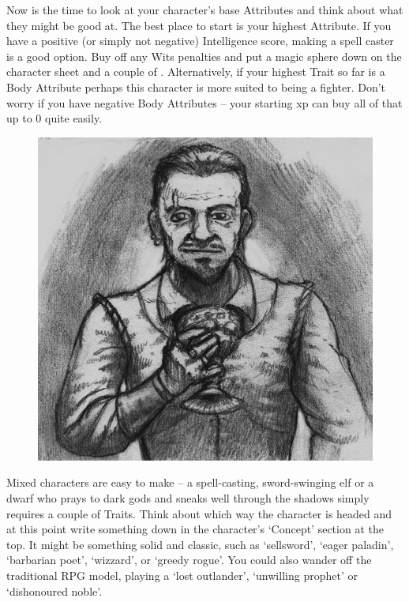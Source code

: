 \begin{multicols}{2}
{Now is the time to look at your character's base Attributes and think about what they might be good at. The best place to start is your highest Attribute. If you have a positive (or simply not negative) Intelligence score, making a spell caster is a good option. Buy off any Wits penalties and put a magic sphere down on the character sheet and a couple of . Alternatively, if your highest Trait so far is a Body Attribute perhaps this character is more suited to being a fighter. Don't worry if you have negative Body Attributes -- your starting \gls{xp} can buy all of that up to 0 quite easily.

\begin{figure}

	\includegraphics[width=\linewidth]{images/Roch_Hercka/xp-2.jpg}
	\label{roch:xp2}

\end{figure}

Mixed characters are easy to make -- a spell-casting, sword-swinging elf or a dwarf who prays to dark gods and sneaks well through the shadows simply requires a couple of Traits.
Think about which way the character is headed and at this point write something down in the character's `Concept' section at the top.
It might be something solid and classic, such as `sellsword', `eager paladin', `barbarian poet', `wizzard', or `greedy rogue'.
You could also wander off the traditional RPG model, playing a `lost outlander', `unwilling prophet' or `dishonoured noble'.

}
\end{multicols}
